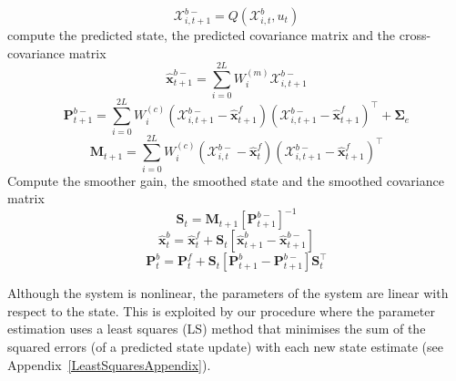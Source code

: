 \documentclass[12pt]{iopart}
\begin{document}
\begin{algorithm}
\begin{small}
\begin{algorithmic}[1]
		\begin{equation*}
			\mathcal X_{i,t+1}^{b-}=Q(\mathcal X_{i,t}^b,u_t) 
		\end{equation*}
		 compute the predicted state, the predicted covariance matrix and the cross-covariance matrix
		\begin{equation*}
			\hat{\mathbf x}_{t+1}^{b-}=\sum_{i=0}^{2L} W_i^{(m)}\mathcal X_{i,t+1}^{b-} 
		\end{equation*}
		\begin{equation*}
			\mathbf P_{t +1}^{b-}=\sum_{i=0}^{2L} W_i^{(c)}(\mathcal X_{i,t+1}^{b-}-\hat{\mathbf x}_{t +1}^{f})(\mathcal X_{i,t+1}^{b-}-\hat{\mathbf x}_{t +1}^{f})^\top+\boldsymbol \Sigma_e 
		\end{equation*}
		\begin{equation*}
			\mathbf M_{t +1}=\sum_{i=0}^{2L} W_i^{(c)}(\mathcal X_{i,t}^{b-}-\hat{\mathbf x}_{t}^{f})(\mathcal X_{i,t+1}^{b-}-\hat{\mathbf x}_{t+1}^{f})^\top 
		\end{equation*}
		 Compute the smoother gain, the smoothed state and the smoothed covariance matrix
		\begin{equation*}
			\mathbf S_t=\mathbf M_{t +1}\left[ \mathbf P_{t +1}^{b-}\right] ^{-1} 
		\end{equation*}
		\begin{equation*}
			\hat{\mathbf x}_t^b=\hat{\mathbf x}_t^f+\mathbf S_t\left[\hat{\mathbf x}_{t+1}^{b}-\hat{\mathbf x}_{t+1}^{b-}\right] 
		\end{equation*}
		\begin{equation*}
			\mathbf P_{t}^{b}=\mathbf P_{t}^{f}+\mathbf S_t\left[\mathbf P_{t+1}^{b}-\mathbf P_{t+1}^{b-} \right]\mathbf S_t^\top 
		\end{equation*}
	\end{algorithmic}
\end{small}
\end{algorithm}

Although the system is nonlinear, the parameters of the system are linear with respect to the state. This is exploited by our procedure where the parameter estimation uses a least squares (LS) method that minimises the sum of the squared errors (of a predicted state update) with each new state estimate (see Appendix~\ref{LeastSquaresAppendix}).
\end{document}
